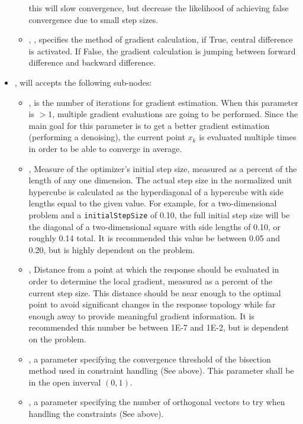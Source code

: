\begin{itemize}
\begin{itemize}
    this will slow convergence, but decrease the likelihood of achieving false convergence due to small step
    sizes.
  \item {}, , specifies the method of gradient calculation, if True,
    central difference is activated. If False, the gradient calculation is jumping between forward difference and backward difference.
  \end{itemize}
\item {},  will accepts the following sub-nodes:
  \begin{itemize}
  \item {},  is the number of iterations for gradient estimation. When this
        parameter is $>1$, multiple gradient evaluations are going to be performed. Since the main goal for this parameter is to
        get a better gradient estimation (performing a denoising), the current point $x_k$ is evaluated multiple times in order to be able to
        converge in average.

  \item {},  Measure of the optimizer's initial step
    size, measured as a percent of the length of any one dimension. The actual step size in the normalized
    unit hypercube is calculated as the hyperdiagonal of a hypercube with side lengths equal to the given
    value. For example, for a two-dimensional problem and a \texttt{initialStepSize} of 0.10, the full initial
    step size will be the diagonal of a two-dimensional square with side lengths of 0.10, or roughly 0.14
    total. It is recommended this value be between 0.05 and 0.20, but is highly dependent on the problem.
  \item {},  Distance from a point at which the
    response should be evaluated in order to determine the local gradient, measured as a percent of the
    current step size. This distance should be near enough to the optimal point to avoid significant changes
    in the response topology while far enough away to provide meaningful gradient information. It is
    recommended this number be between 1E-7 and 1E-2, but is dependent on the problem.
  \item {},  a parameter specifying the convergence threshold of the
  bisection method used in constraint handling (See above). This parameter shall be in the open inverval $(0,1)$.
  \item {},  a parameter specifying the number of orthogonal vectors to try
  when handling the constraints (See above).
  \end{itemize}
\end{itemize}


